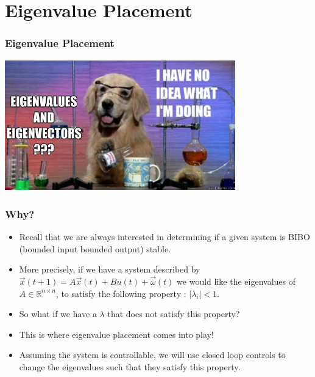 \documentclass{beamer}
\newcommand{\R}{\mathbb{R}}
\begin{document}


\section{Eigenvalue Placement}

\begin{frame}
\frametitle{Eigenvalue Placement} 
\centering\includegraphics[width = 10cm]{eigenvalue.jpg}
\end{frame}

\begin{frame}
\frametitle{Why?} 
\begin{itemize}
\item Recall that we are always interested in determining if a given system is BIBO (bounded input bounded output) stable. 
\item More precisely, if we have a system described by $\vec{x}(t+1) = A\vec{x}(t) + Bu(t) + \vec{\omega}(t)$ we would like the eigenvalues of $A \in \R^{n \times n}$, to satisfy the following property : $|\lambda_i| < 1$. 
\item So what if we have a $\lambda$ that does not satisfy this property?
\item This is where eigenvalue placement comes into play!
\item Assuming the system is controllable, we will use closed loop controls to change the eigenvalues such that they satisfy this property. 
\end{itemize}
\end{frame}
\end{document}
